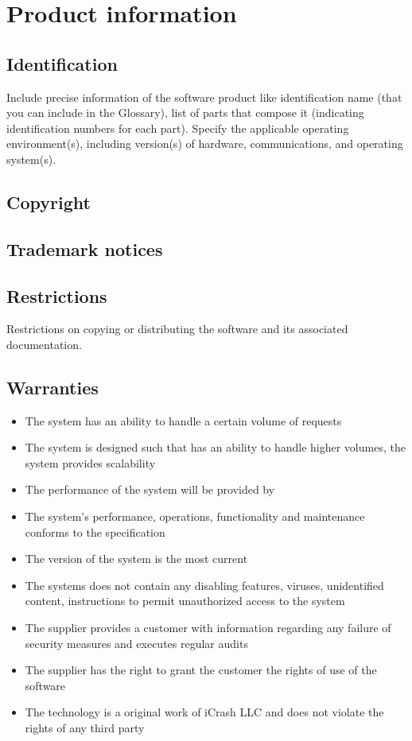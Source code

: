 \chapter{Product information}
\vspace{-6em}


\section{Identification}
Include precise information of the software product like identification name (that you can include in the \gls{Glossary}), list of parts that compose it (indicating identification numbers for each part). 
Specify the applicable operating environment(s), including version(s) of hardware, communications, and operating system(s).

\section{Copyright}

\section{Trademark notices}

\section{Restrictions}
Restrictions on copying or distributing the software and its associated
documentation.

\section{Warranties}
\begin{itemize}
  \item The system has an ability to handle a certain volume of requests
  \item The system is designed such that has an ability to handle higher volumes, the system provides scalability
  \item The performance of the system will be provided by
  \item The system's performance, operations, functionality and maintenance
  conforms to the specification
  \item The version of the system is the most current
  \item The systems does not contain any disabling features, viruses, unidentified content, instructions to permit unauthorized access to the system
  \item The supplier provides a customer with information regarding any failure of security measures and executes regular audits
  \item The supplier has the right to grant the customer the rights of use of the software
  \item The technology is a original work of iCrash LLC and does not violate the rights of any third party
\end{itemize}


